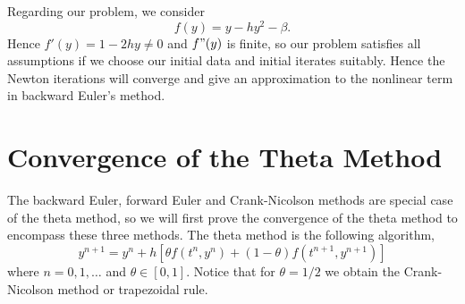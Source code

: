 Regarding our problem, we consider 
\begin{equation}
f(y)=y-hy^{2}-\beta.
\end{equation}
Hence $f'(y)=1-2hy\neq0$ and $f"(y)$ is finite, so our problem satisfies all assumptions if we choose our initial data and initial iterates suitably. Hence the Newton iterations will converge and give an approximation to the nonlinear term in backward Euler's method.

\section{Convergence of the Theta Method}

The backward Euler, forward Euler and Crank-Nicolson methods are special case of the theta method, so we will first prove the convergence of the theta method to encompass these three methods. The theta method is the following algorithm,
\begin{equation}
y^{n+1}=y^{n}+h[\theta f(t^{n},y^{n})+(1-\theta)f(t^{n+1},y^{n+1})]
\end{equation}
where
$n=0,1,\ldots$ and $\theta\in[0,1]$. Notice that for $\theta=1/2$ we obtain the Crank-Nicolson method or trapezoidal rule.

